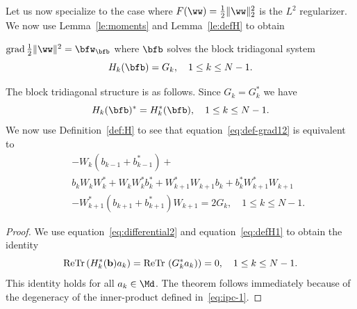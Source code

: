 Let us now specialize to the case where $F(\ww) = \tfrac{1}{2} \|\ww\|_2^2$ is the $L^2$ regularizer.
We now use Lemma~\ref{le:moments} and Lemma~\ref{le:defH} to obtain
\begin{lemma}
    \label{le:grad} $\grad \tfrac{1}{2} \|\ww \|^2 = \bfw_\bfb$ where $\bfb$ solves the block tridiagonal system 
\begin{equation}
\label{eq:def-grad12}
H_k(\bfb)= G_k, \quad 1\leq k \leq N-1.    
\end{equation}
\end{lemma}
The block tridiagonal structure is as follows.  Since $G_k=G_k^*$ we have
\begin{equation}
\label{eq:def-grad12a}
H_k(\bfb)^* = H_k^*(\bfb), \quad 1\leq k \leq N-1.   
\end{equation}
We now use Definition~\ref{def:H} to see that equation~\eqref{eq:def-grad12} is equivalent to 
    \begin{eqnarray}
        \nonumber
        && -W_k(b_{k-1}+b_{k-1}^*) + \\
        \label{eq:def-grad4}
        && b_k W_k W_k^* + W_k W_k^* b_k^* + W_{k+1}^*W_{k+1}b_k + b_k^* W_{k+1}^* W_{k+1} \\
        \nonumber
        && - W_{k+1}^*(b_{k+1}+ b_{k+1}^*) W_{k+1}= 2 G_k, \quad 1 \leq k \leq N-1.
    \end{eqnarray}
\begin{proof}
We use equation~\eqref{eq:differential2} and equation~\eqref{eq:defH1} to obtain the identity
\begin{equation}
    \mathrm{Re} \mathrm{Tr}\,(H_k^*(\mathbf{b}) a_k) = \mathrm{Re} \mathrm{Tr}\, \left(G_k^* a_k)\right) =0, \quad 1\leq k \leq N-1.
\end{equation}  
This identity holds for all $a_k \in \Md$. The theorem follows immediately because of the degeneracy of the inner-product defined in~\eqref{eq:ipc-1}.
\end{proof}
